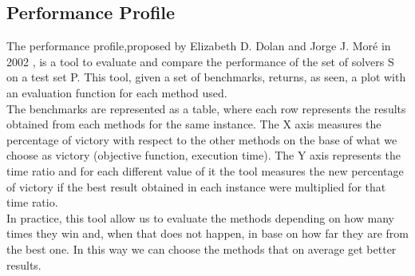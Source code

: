 \begin{appendices}
\chapter{Performance Profile}
The performance profile,proposed by Elizabeth D. Dolan and Jorge J. Moré in 2002 \cite{dolan2002benchmarking}, is a tool to evaluate and compare the performance of the set of solvers S on a test set P. This tool, given a set of benchmarks, returns, as seen, a plot with an evaluation function for each method used.\\
The benchmarks are represented as a table, where each row represents the results obtained from each methods for the same instance.
The X axis measures the percentage of victory with respect to the other methods on the base of what we choose as victory (objective function, execution time). The Y axis represents the time ratio and for each different value of it the tool measures the new percentage of victory if the best result obtained in each instance were multiplied for that time ratio.\\
In practice, this tool allow us to evaluate the methods depending on how many times they win and, when that does not happen, in base on how far they are from the best one. In this way we can choose the methods that on average get better results.


\end{appendices}
